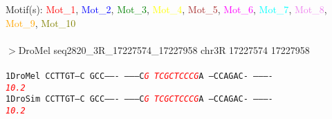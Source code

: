 \documentclass[11pt,twoside,reqno,a4paper]{article}
\begin{document}
\noindent
\newlength{\charwidth}Motif(s): \textcolor{red}{Mot\_1}, \textcolor{blue}{Mot\_2}, \textcolor{green}{Mot\_3}, \textcolor{yellow}{Mot\_4}, \textcolor{brown}{Mot\_5}, \textcolor{magenta}{Mot\_6}, \textcolor{cyan}{Mot\_7}, \textcolor{violet}{Mot\_8}, \textcolor{orange}{Mot\_9}, \textcolor{olive}{Mot\_10}\\
\\
$>$DroMel	seq2820\_3R\_17227574\_17227958	chr3R	17227574	17227958 \\
 \\
\texttt{1\hspace*{3\charwidth}DroMel	CCTTGT---C	GCC-------	--------C\textit{\textcolor{red}{G}}	\textit{\textcolor{red}{T}}\textit{\textcolor{red}{C}}\textit{\textcolor{red}{G}}\textit{\textcolor{red}{C}}\textit{\textcolor{red}{T}}\textit{\textcolor{red}{C}}\textit{\textcolor{red}{C}}\textit{\textcolor{red}{C}}\textit{\textcolor{red}{G}}A	---CCAGAC-	----------	\\
\hspace*{4\charwidth}\hspace*{7\charwidth}\hspace*{1\charwidth}\hspace*{1\charwidth}\hspace*{29\charwidth}\textit{\textcolor{red}{10.2}}\hspace*{1\charwidth}\hspace*{1\charwidth}\hspace*{1\charwidth}\hspace*{1\charwidth}\\
1\hspace*{3\charwidth}DroSim	CCTTGT---C	GCC-------	--------C\textit{\textcolor{red}{G}}	\textit{\textcolor{red}{T}}\textit{\textcolor{red}{C}}\textit{\textcolor{red}{G}}\textit{\textcolor{red}{C}}\textit{\textcolor{red}{T}}\textit{\textcolor{red}{C}}\textit{\textcolor{red}{C}}\textit{\textcolor{red}{C}}\textit{\textcolor{red}{G}}A	---CCAGAC-	----------	\\
\hspace*{4\charwidth}\hspace*{7\charwidth}\hspace*{1\charwidth}\hspace*{1\charwidth}\hspace*{29\charwidth}\textit{\textcolor{red}{10.2}}\hspace*{1\charwidth}\hspace*{1\charwidth}\hspace*{1\charwidth}\hspace*{1\charwidth}\\
}
\end{document}
